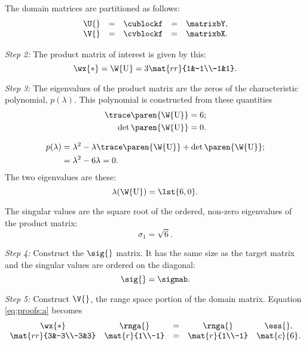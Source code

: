 The domain matrices are partitioned as follows:
\begin{equation}
  \begin{array}{lcccl}
    \U{} &=& \cublockf &=& \matrixbY, \\
    \V{} &=& \cvblockf &=& \matrixbX.
  \end{array}
\end{equation}

\textit{Step 2:} The product matrix of interest is given by this:
\begin{equation}
  \wx{*} = \W{\mathrm{U}} = 3 \mat{rr}{1&-1\\-1&1}.
\end{equation}

\textit{Step 3:} The eigenvalues of the product matrix are the zeros of the characteristic polynomial, $p(\lambda)$. This polynomial is constructed from these quantities
\begin{equation}
  \begin{split}
    \trace \paren{\W{\mathrm{U}}} & = 6;\\
    \det \paren{\W{\mathrm{U}}}& = 0.
  \end{split}
\end{equation}

\begin{equation}
  \begin{split}
    p(\lambda) & = \lambda^{2} - \lambda \trace \paren{\W{\mathrm{U}}} +\det \paren{\W{\mathrm{U}}};\\
    &= \lambda^{2} - 6 \lambda = 0.
  \end{split}
\end{equation}
The two eigenvalues are these:
\begin{equation}
  \lambda(\W{\mathrm{U}}) = \lst{6,0}.
\end{equation}

The singular values are the square root of the ordered, non-zero eigenvalues of the product matrix:
\begin{equation}
  \sigma_{1} = \sqrt{6}.
\end{equation}

\textit{Step 4:} Construct the $\sig{}$ matrix. It has the same size as the target matrix and the singular values are ordered on the diagonal:
\begin{equation}
  \sig{} = \sigmab.
\end{equation}

\textit{Step 5:} Construct $\V{}_{}$, the range space portion of the domain matrix. Equation \eqref{eq:proofs:a} becomes
\begin{equation}
\begin{array}{ccccc}
  \wx{*}&\rnga{} &=& \rnga{}&\ess{},\\
  \mat{rr}{3&-3\\-3&3}&\mat{r}{1\\-1} &=& \mat{r}{1\\-1} & \mat{c}{6}.
\end{array}
\end{equation}

